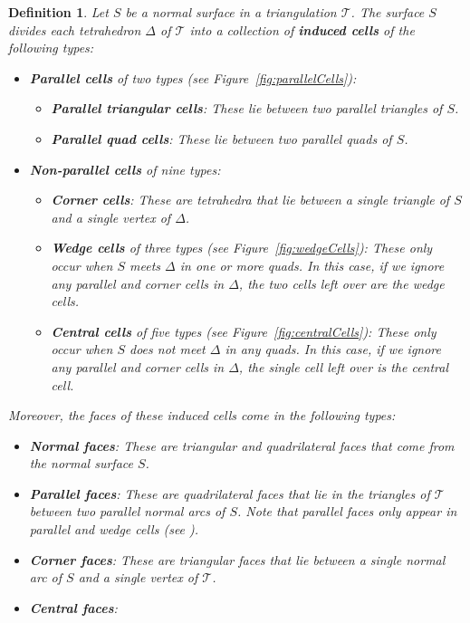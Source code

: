 \documentclass[10pt,a4paper]{amsart}
\newtheorem{definition}[theorem]{Definition}
\newcommand{\tri}{\mathcal{T}}
\begin{document}
\begin{definition}\label{defs:inducedCells}
Let $S$ be a normal surface in a triangulation $\tri$.
The surface $S$ divides each tetrahedron $\Delta$ of $\tri$ into a collection of \textbf{induced cells} of the following types:
\begin{itemize}
\item \textbf{Parallel cells} of two types (see Figure~\ref{fig:parallelCells}):
	\begin{itemize}
	\item \textbf{Parallel triangular cells}:
	These lie between two parallel triangles of $S$.
	\item \textbf{Parallel quad cells}:
	These lie between two parallel quads of $S$.
	\end{itemize}
\item \textbf{Non-parallel cells} of nine types:
	\begin{itemize}
	\item \textbf{Corner cells}: These are tetrahedra that lie between a single triangle of $S$ and a single vertex of $\Delta$.
	\item \textbf{Wedge cells} of three types (see Figure~\ref{fig:wedgeCells}):
	These only occur when $S$ meets $\Delta$ in one or more quads.
	In this case, if we ignore any parallel and corner cells in $\Delta$, the two cells left over are the wedge cells.
	\item \textbf{Central cells} of five types (see Figure~\ref{fig:centralCells}):
	These only occur when $S$ does not meet $\Delta$ in any quads.
	In this case, if we ignore any parallel and corner cells in $\Delta$, the single cell left over is the central cell.
	\end{itemize}
\end{itemize}
Moreover, the faces of these induced cells come in the following types:
\begin{itemize}
\item \textbf{Normal faces}:
These are triangular and quadrilateral faces that come from the normal surface $S$.
\item \textbf{Parallel faces}:
These are quadrilateral faces that lie in the triangles of $\tri$ between two parallel normal arcs of $S$.
Note that parallel faces only appear in parallel and wedge cells (see ).
\item \textbf{Corner faces}:
These are triangular faces that lie between a single normal arc of $S$ and a single vertex of $\tri$.
\item \textbf{Central faces}:

\end{itemize}
\end{definition}
\end{document}
